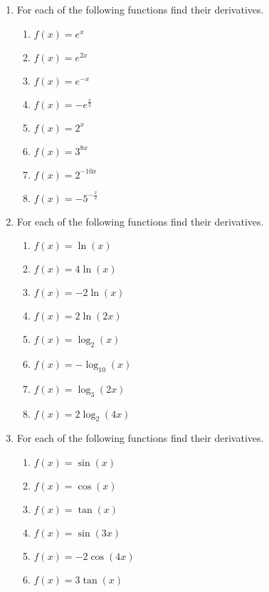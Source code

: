 \documentclass[a4paper,12pt]{article}
\begin{document}
\begin{enumerate}
\item For each of the following functions find their derivatives.
    \begin{multicols}{2}
    \begin{enumerate}
    \item \sspacer$f(x) = e^x$
    \item \sspacer$f(x) = e^{2x}$
    \item \sspacer$f(x) = e^{-x}$
    \item \sspacer$f(x) = -e^{\frac{x}{2}}$
    \item \sspacer$f(x) = 2^x$
    \item \sspacer$f(x) = 3^{8x}$
    \item \sspacer$f(x) = 2^{-10x}$
    \item \sspacer$f(x) = -5^{-\frac{x}{2}}$
    \end{enumerate}
    \end{multicols}

\item For each of the following functions find their derivatives.
    \begin{multicols}{2}
    \begin{enumerate}
    \item \rule[-0.5em]{0em}{1.5em}$f(x) = \ln(x)$
    \item \rule[-0.5em]{0em}{1.5em}$f(x) = 4\ln(x)$
    \item \rule[-0.5em]{0em}{1.5em}$f(x) = -2\ln(x)$
    \item \rule[-0.5em]{0em}{1.5em}$f(x) = 2\ln(2x)$
    \item \rule[-0.5em]{0em}{1.5em}$f(x) = \log_2(x)$
    \item \rule[-0.5em]{0em}{1.5em}$f(x) = -\log_{10}(x)$
    \item \rule[-0.5em]{0em}{1.5em}$f(x) = \log_3(2x)$
    \item \rule[-0.5em]{0em}{1.5em}$f(x) = 2\log_2(4x)$
    \end{enumerate}
    \end{multicols}

\item For each of the following functions find their derivatives.
    \begin{multicols}{2}
    \begin{enumerate}
    \item \sspacer$f(x) = \sin(x)$
    \item \sspacer$f(x) = \cos(x)$
    \item \sspacer$f(x) = \tan(x)$
    \item \sspacer$f(x) = \sin(3x)$
    \item \sspacer$f(x) = -2\cos(4x)$
    \item \sspacer$f(x) = 3\tan(x)$
    \end{enumerate}
    \end{multicols}


\end{enumerate}
\end{document}
